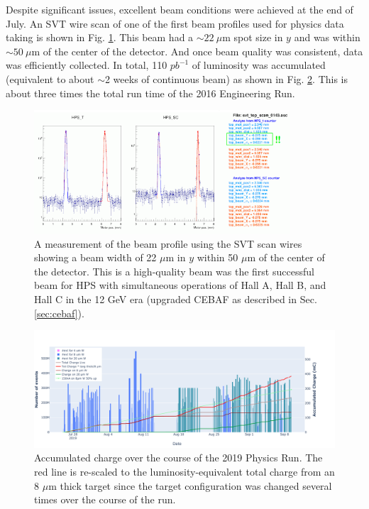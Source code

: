 Despite significant issues, excellent beam conditions were achieved at the end of July. An SVT wire scan of one of the first beam profiles used for physics data taking is shown in Fig. \ref{fig:beam2019}. This beam had a $\sim 22 \ \mu$m spot size in $y$ and was within $\sim 50 \ \mu$m of the center of the detector. And once beam quality was consistent, data was efficiently collected. In total, 110 $pb^{-1}$ of luminosity was accumulated (equivalent to about $\sim$2 weeks of continuous beam) as shown in Fig. \ref{fig:data2019}. This is about three times the total run time of the 2016 Engineering Run.

\begin{figure}
    \centering
    \includegraphics[width=0.85\textwidth]{figs/upgrades/2019_beam.png}
    \caption{A measurement of the beam profile using the SVT scan wires showing a beam width of 22 $\mu$m in $y$ within 50 $\mu$m of the center of the detector. This is a high-quality beam was the first successful beam for HPS with simultaneous operations of Hall A, Hall B, and Hall C in the 12 GeV era (upgraded CEBAF as described in Sec. \ref{sec:cebaf}).}
    \label{fig:beam2019}
\end{figure}

\begin{figure}
    \centering
    \includegraphics[width=1.0\textwidth]{figs/upgrades/HPSRun2019_progress-1.pdf}
    \caption{Accumulated charge over the course of the 2019 Physics Run. The red line is re-scaled to the luminosity-equivalent total charge from an 8 $\mu$m thick target since the target configuration was changed several times over the course of the run.}
    \label{fig:data2019}
\end{figure}

